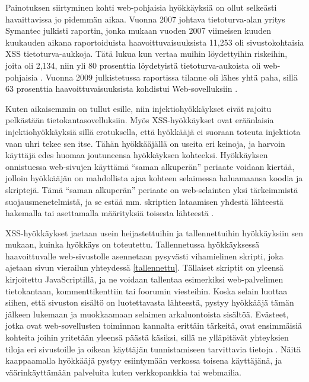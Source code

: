 Painotuksen siirtyminen kohti web-pohjaisia hyökkäyksiä on ollut selkeästi havaittavissa jo pidemmän aikaa. Vuonna 2007 johtava tietoturva-alan 
yritys Symantec julkisti raportin, jonka  mukaan vuoden 2007 viimeisen kuuden kuukauden aikana raportoiduista haavoittuvaisuuksista 11,253
oli sivustokohtaisia XSS tietoturva-aukkoja. Tätä lukua kun vertaa muihin löydettyihin riskeihin, joita oli 2,134, niin 
yli 80 prosenttia löydetyistä tietoturva-aukoista oli web-pohjaisia \cite{SYM}. Vuonna 2009 julkistetussa raportissa tilanne oli lähes yhtä paha, 
sillä 63 prosenttia haavoittuvaisuuksista kohdistui Web-sovelluksiin \cite{SYM2}.

Kuten aikaisemmin on tullut esille, niin injektiohyökkäykset eivät rajoitu pelkästään tietokantasovelluksiin. Myös XSS-hyökkäykset ovat eräänlaisia 
injektiohyökkäyksiä sillä erotuksella, että hyökkääjä ei suoraan toteuta injektiota vaan uhri tekee sen itse. Tähän hyökkääjällä on useita eri 
keinoja, ja harvoin käyttäjä edes huomaa joutuneensa hyökkäyksen kohteeksi. Hyökkäyksen onnistuessa web-sivujen käyttämä ``saman alkuperän'' periaate 
voidaan kiertää, jolloin hyökkääjän on mahdollista ajaa kohteen selaimessa haluamaansa koodia ja skriptejä. Tämä ``saman alkuperän'' periaate on web-selainten 
yksi tärkeimmistä suojausmenetelmistä, ja se estää mm. skriptien lataamisen yhdestä lähteestä hakemalla tai asettamalla määrityksiä toisesta lähteestä \cite{WEB2}.

XSS-hyökkäykset jaetaan usein heijastettuihin ja tallennettuihin hyökkäyksiin sen mukaan, kuinka hyökkäys on toteutettu. Tallennetussa hyökkäyksessä haavoittuvalle 
web-sivustolle asennetaan pysyvästi vihamielinen skripti, joka ajetaan sivun vierailun yhteydessä \ref{tallennettu}. Tällaiset skriptit on yleensä kirjoitettu JavaScriptillä,
ja ne voidaan tallentaa esimerkiksi web-palvelimen tietokantaan, kommenttikenttiin tai foorumin viesteihin. Koska selain luottaa siihen, 
että sivuston sisältö on luotettavasta lähteestä, pystyy hyökkääjä tämän jälkeen lukemaan ja muokkaamaan selaimen arkaluontoista sisältöä. Evästeet, jotka ovat web-sovellusten 
toiminnan kannalta erittäin tärkeitä, ovat ensimmäisiä kohteita joihin yritetään yleensä päästä käsiksi, sillä ne ylläpitävät yhteyksien tiloja eri 
sivustoille ja oikean käyttäjän tunnistamiseen tarvittavia tietoja \cite{WEB2b}. Näitä kaappaamalla hyökkääjä pystyy esiintymään verkossa toisena käyttäjänä, 
ja väärinkäyttämään palveluita kuten verkkopankkia tai webmailia. 


